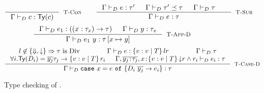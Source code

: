 \begin{figure}[t!]
{$$
\inference{
}{
	\dechastype{\Gamma}{c}{\constty{c}}
}[\rtconst]
\qquad
\inference{
	\dechastype{\Gamma}{e}{\tau'} &&
	\decissubtype{\Gamma}{\tau'}{\tau} &&
	\deciswellformed{\Gamma}{\tau} &&
}{
	\dechastype{\Gamma}{e}{\tau}
}[\rtsub]
$$}
$$
\samerule{
\inference{
	\dechastype{\Gamma, x\colon\tau_x}{e}{\tau} &&
	\deciswellformed{\Gamma}{\tau_x}
}{
	\dechastype{\Gamma}{\efun{x}{e}}{(\tfun{x}{\tau_x}{\tau})}
}[\rtfun]
\qquad}
\inference{
	\dechastype{\Gamma}{e_1}{(\tfunref{x}{\tau_{x}}{\tau}{v}{e_v})} &&
	\dechastype{\Gamma}{\restrictdecidable{y}{e_2}}{\tau_{x}}
}{
	\dechastype{\Gamma}{\eapp{e_1}{\restrictdecidable{y}{e_2}}}{\tau\sub{x}{\restrictdecidable{y}{e_2}}}
}[\rtapp-D]
$$
$$\inference{
	l \not \in \{\finite, \trivial\} \Rightarrow \tau \ \text{is}\ \Div &&
	\dechastype{\Gamma}{e}{\tref{v}{T}{l}{r}} &&
	 \deciswellformed{\Gamma}{\tau}\\
	\forall i. \constty{D_i} = \overline{y_j}{\tau_j} \rightarrow \tref{v}{T}{}{r_i} &&
	\dechastype{\Gamma,  \overline{\tbind{y_j}{\tau_j}},
				\tbind{x}{\tref{v}{T}{\restrictdecidable{\trivial}
				{\ltrivial}
				}{r \land r_i}}}{e_i}{\tau}	
}{
	\dechastype{\Gamma}{\ecase{e}{D_i}{\overline{y_j}}{e_i}{x}}{\tau}
}[\rtcased]$$
\caption{Type checking of \declang.}
\label{fig:declang:typing}
\end{figure}

